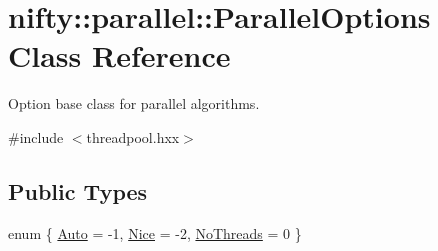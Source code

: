 \hypertarget{classnifty_1_1parallel_1_1ParallelOptions}{}\section{nifty\+:\+:parallel\+:\+:Parallel\+Options Class Reference}
\label{classnifty_1_1parallel_1_1ParallelOptions}


Option base class for parallel algorithms.  




{\ttfamily \#include $<$threadpool.\+hxx$>$}

\subsection*{Public Types}
\begin{DoxyCompactItemize}
\item 
enum \{ \hyperlink{classnifty_1_1parallel_1_1ParallelOptions_a7a945e8bd698883de4af0f906b2aa88aa0bd8f9fd00d78fcfdcb6ee1575f43fd6}{Auto} = -\/1, 
\hyperlink{classnifty_1_1parallel_1_1ParallelOptions_a7a945e8bd698883de4af0f906b2aa88aad7df42230112f42413aa5fc2b3671651}{Nice} = -\/2, 
\hyperlink{classnifty_1_1parallel_1_1ParallelOptions_a7a945e8bd698883de4af0f906b2aa88aaf7f33aa5c75f955eb0e6f6ca380f7349}{No\+Threads} = 0
 \}
\end{DoxyCompactItemize}
